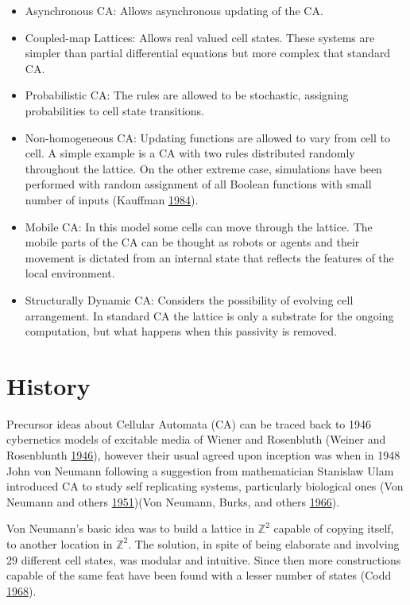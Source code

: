 \documentclass[
]{book}
\begin{document}
\begin{itemize}
\item
  Asynchronous CA:
  Allows asynchronous updating of the CA.
\item
  Coupled-map Lattices:
  Allows real valued cell states. These systems are simpler than partial differential equations but more complex that standard CA.
\item
  Probabilistic CA:
  The rules are allowed to be stochastic, assigning probabilities to cell state transitions.
\item
  Non-homogeneous CA:
  Updating functions are allowed to vary from cell to cell. A simple example is a CA with two rules distributed randomly throughout the lattice. On the other extreme case, simulations have been performed with random assignment of all Boolean functions with small number of inputs (Kauffman \protect\hyperlink{ref-kauffman1984emergent}{1984}).
\item
  Mobile CA:
  In this model some cells can move through the lattice. The mobile parts of the CA can be thought as robots or agents and their movement is dictated from an internal state that reflects the features of the local environment.
\item
  Structurally Dynamic CA:
  Considers the possibility of evolving cell arrangement. In standard CA the lattice is only a substrate for the ongoing computation, but what happens when this passivity is removed.
\end{itemize}

\hypertarget{history}{%
\section{History}\label{history}}

Precursor ideas about Cellular Automata (CA) can be traced back to 1946 cybernetics models of excitable media of Wiener and Rosenbluth (Weiner and Rosenblunth \protect\hyperlink{ref-weiner1946mathematical}{1946}), however their usual agreed upon inception was when in 1948 John von Neumann following a suggestion from mathematician Stanislaw Ulam introduced CA to study self replicating systems, particularly biological ones (Von Neumann and others \protect\hyperlink{ref-von1951general}{1951})(Von Neumann, Burks, and others \protect\hyperlink{ref-von1966theory}{1966}).

Von Neumann's basic idea was to build a lattice in \(\mathds{Z}^2\) capable of copying itself, to another location in \(\mathds{Z}^2\). The solution, in spite of being elaborate and involving 29 different cell states, was modular and intuitive. Since then more constructions capable of the same feat have been found with a lesser number of states (Codd \protect\hyperlink{ref-codd1968cellular}{1968}).
\end{document}
